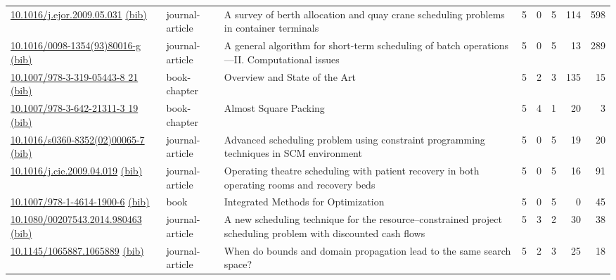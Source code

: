 {\begin{longtable}{p{5cm}lp{11cm}rrrrr}
\href{http://dx.doi.org/10.1016/j.ejor.2009.05.031}{10.1016/j.ejor.2009.05.031} \href{https://www.doi2bib.org/bib/10.1016/j.ejor.2009.05.031}{(bib)} & journal-article & A survey of berth allocation and quay crane scheduling problems in container terminals & 5 & 0 & 5 & 114 & 598 \\
\href{http://dx.doi.org/10.1016/0098-1354(93)80016-g}{10.1016/0098-1354(93)80016-g} \href{https://www.doi2bib.org/bib/10.1016/0098-1354(93)80016-g}{(bib)} & journal-article & A general algorithm for short-term scheduling of batch operations—II. Computational issues & 5 & 0 & 5 & 13 & 289 \\
\href{http://dx.doi.org/10.1007/978-3-319-05443-8_21}{10.1007/978-3-319-05443-8 21} \href{https://www.doi2bib.org/bib/10.1007/978-3-319-05443-8_21}{(bib)} & book-chapter & Overview and State of the Art & 5 & 2 & 3 & 135 & 15 \\
\href{http://dx.doi.org/10.1007/978-3-642-21311-3_19}{10.1007/978-3-642-21311-3 19} \href{https://www.doi2bib.org/bib/10.1007/978-3-642-21311-3_19}{(bib)} & book-chapter & Almost Square Packing & 5 & 4 & 1 & 20 & 3 \\
\href{http://dx.doi.org/10.1016/s0360-8352(02)00065-7}{10.1016/s0360-8352(02)00065-7} \href{https://www.doi2bib.org/bib/10.1016/s0360-8352(02)00065-7}{(bib)} & journal-article & Advanced scheduling problem using constraint programming techniques in SCM environment & 5 & 0 & 5 & 19 & 20 \\
\href{http://dx.doi.org/10.1016/j.cie.2009.04.019}{10.1016/j.cie.2009.04.019} \href{https://www.doi2bib.org/bib/10.1016/j.cie.2009.04.019}{(bib)} & journal-article & Operating theatre scheduling with patient recovery in both operating rooms and recovery beds & 5 & 0 & 5 & 16 & 91 \\
\href{http://dx.doi.org/10.1007/978-1-4614-1900-6}{10.1007/978-1-4614-1900-6} \href{https://www.doi2bib.org/bib/10.1007/978-1-4614-1900-6}{(bib)} & book & Integrated Methods for Optimization & 5 & 0 & 5 & 0 & 45 \\
\href{http://dx.doi.org/10.1080/00207543.2014.980463}{10.1080/00207543.2014.980463} \href{https://www.doi2bib.org/bib/10.1080/00207543.2014.980463}{(bib)} & journal-article & A new scheduling technique for the resource–constrained project scheduling problem with discounted cash flows & 5 & 3 & 2 & 30 & 38 \\
\href{http://dx.doi.org/10.1145/1065887.1065889}{10.1145/1065887.1065889} \href{https://www.doi2bib.org/bib/10.1145/1065887.1065889}{(bib)} & journal-article & When do bounds and domain propagation lead to the same search space? & 5 & 2 & 3 & 25 & 18 \\

\end{longtable}}
